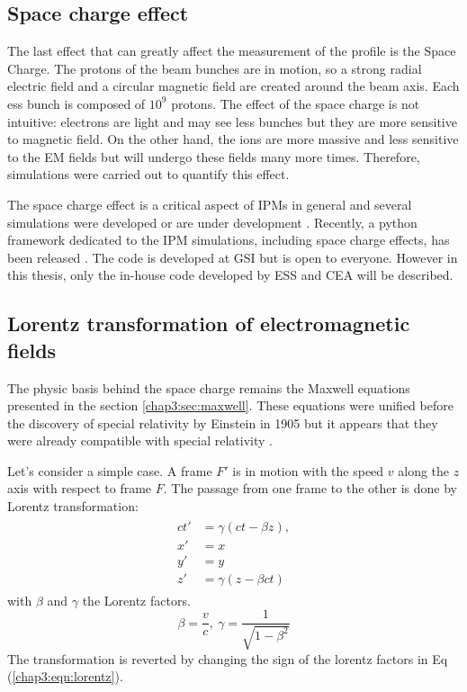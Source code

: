 \begin{refsection}
  \section{Space charge effect}
  The last effect that can greatly affect the measurement of the profile is the Space Charge. The protons of the beam bunches are in motion, so a strong radial electric field and a circular magnetic field are created around the beam axis. Each \acrshort{ess} bunch is composed of $10^{9}$ protons. The effect of the space charge is not intuitive: electrons are light and may see less bunches but they are more sensitive to magnetic field. On the other hand, the ions are more massive and less sensitive to the EM fields but will undergo these fields many more times. Therefore, simulations were carried out to quantify this effect.

  The space charge effect is a critical aspect of IPMs in general and several simulations were developed or are under development \cite{Sapinski2016,IPMcolab2019}. Recently, a python framework dedicated to the IPM simulations, including space charge effects, has been released \cite{Vilsmeier2019}. The code is developed at GSI but is open to everyone. However in this thesis, only the in-house code developed by ESS and CEA will be described.

  \subsection{Lorentz transformation of electromagnetic fields}
  The physic basis behind the space charge remains the Maxwell equations presented in the section \ref{chap3:sec:maxwell}. These equations were unified before the discovery of special relativity by Einstein in 1905 but it appears that they were already compatible with special relativity \cite{feynman2011feynman}.

  Let's consider a simple case. A frame $F\prime$ is in motion with the speed $v$ along the $z$ axis with respect to frame $F$. The passage from one frame to the other is done by Lorentz transformation:
  \begin{align}
    \label{chap3:eqn:lorentz}
    \begin{split}
      ct\prime &= \gamma (ct - \beta z) ,
      \\
      x\prime &= x
      \\
      y\prime &= y
      \\
      z\prime &= \gamma (z - \beta ct)
    \end{split}
  \end{align}
  with $\beta$ and $\gamma$ the Lorentz factors.
  \begin{equation}
    \beta = \frac{v}{c}
    ,\
    \gamma = \frac{1}{\sqrt{1 - \beta^{2}}}
  \end{equation}
  The transformation is reverted by changing the sign of the lorentz factors in Eq (\ref{chap3:eqn:lorentz}).


\end{refsection}
